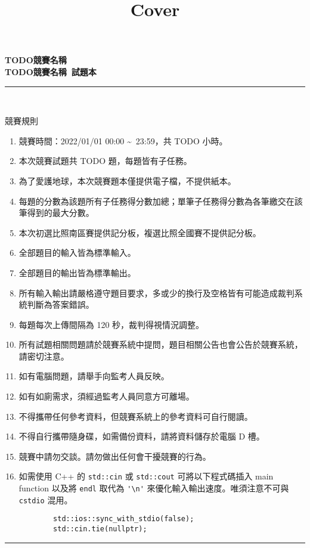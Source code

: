 \documentclass[a4paper]{article}
\title{Cover}
\begin{document}
\begin{center}
\textbf{\huge TODO競賽名稱}\\
\vspace{5mm}
\textbf{\huge TODO競賽名稱\ 試題本}\\
\vspace{10mm}
\rule{17cm}{2pt}\\
\vspace{5mm}

\huge 競賽規則\\
\end{center}

\fontsize{14pt}{20pt}\selectfont
\begin{enumerate}
    \setlength\itemsep{0.5pt}
    \item 競賽時間：2022/01/01 00:00 \textasciitilde \, 23:59，共 TODO 小時。
    \item 本次競賽試題共 TODO 題，每題皆有子任務。
    \item 為了愛護地球，本次競賽題本僅提供電子檔，不提供紙本。
    \item 每題的分數為該題所有子任務得分數加總；單筆子任務得分數為各筆繳交在該筆得到的最大分數。
    \item 本次初選比照南區賽提供記分板，複選比照全國賽不提供記分板。
    \item 全部題目的輸入皆為標準輸入。
    \item 全部題目的輸出皆為標準輸出。
    \item 所有輸入輸出請嚴格遵守題目要求，多或少的換行及空格皆有可能造成裁判系統判斷為答案錯誤。
    \item 每題每次上傳間隔為 120 秒，裁判得視情況調整。
    \item 所有試題相關問題請於競賽系統中提問，題目相關公告也會公告於競賽系統，請密切注意。
    \item 如有電腦問題，請舉手向監考人員反映。
    \item 如有如廁需求，須經過監考人員同意方可離場。
    \item 不得攜帶任何參考資料，但競賽系統上的參考資料可自行閱讀。
    \item 不得自行攜帶隨身碟，如需備份資料，請將資料儲存於電腦 D 槽。
    \item 競賽中請勿交談。請勿做出任何會干擾競賽的行為。
    \item 如需使用 C++ 的 \lstinline{std::cin} 或 \lstinline{std::cout} 可將以下程式碼插入 main function 以及將 \lstinline{endl} 取代為 \lstinline{'\n'} 來優化輸入輸出速度。唯須注意不可與 \lstinline{cstdio} 混用。
        \begin{lstlisting}
        std::ios::sync_with_stdio(false);
        std::cin.tie(nullptr);
        \end{lstlisting}

\end{enumerate}

\begin{center}
\rule{17cm}{2pt}\\
\end{center}
\end{document}
